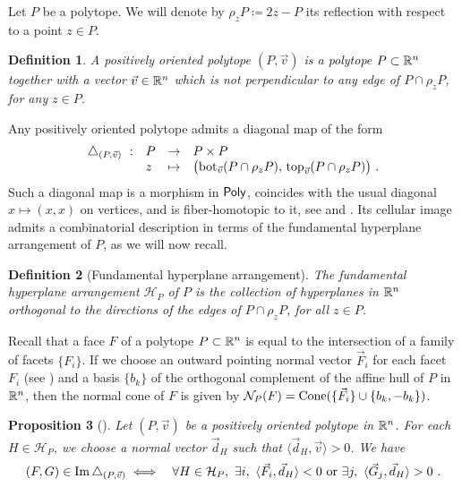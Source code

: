 \documentclass[twoside, 11pt]{amsart}
\newtheorem{definition}{Definition}[section]
\newtheorem{proposition}[definition]{Proposition}
\theoremstyle{remark}
\begin{document}
Let $P$ be a polytope.
We will denote by $\rho_z P \coloneqq 2z-P$ its reflection with respect to a point $z \in P$. 

\begin{definition}
A \emph{positively oriented polytope} $(P, \vec v)$ is a polytope $P \subset \mathbb{R}^n$ together with a vector $\vec v\in \mathbb{R}^n$ which is not perpendicular to any edge of $P\cap \rho_z P$, for any $z \in P$.
\end{definition}

Any positively oriented polytope admits a diagonal map of the form
\begin{align*}
\begin{array}{rlcl}
\triangle_{(P,\vec v)}\  : & P &\to  &P \times P\\
&z & \mapsto& 
\bigl(\operatorname{bot}_{\vec v}(P\cap \rho_zP),\,  \operatorname{top}_{\vec v}(P\cap \rho_z P)\bigr) \ .
\end{array}
\end{align*}
Such a diagonal map is a morphism in $\mathsf{Poly}$, coincides with the usual diagonal $x\mapsto (x, x)$ on vertices, and is fiber-homotopic to it, see \cite[Proposition~5]{MTTV19} and \cite[Proposition 1.1]{LA21}.
Its cellular image admits a combinatorial description in terms of the fundamental hyperplane arrangement of $P$, as we will now recall.

\begin{definition}[Fundamental hyperplane arrangement]
  \label{def:fundamentalhyperplane} 
  The \emph{fundamental hyperplane arrangement} $\mathcal{H}_P$ of $P$ is the collection of hyperplanes in $\mathbb{R}^n$ orthogonal to the directions of the edges of $P\cap\rho_z P$, for all $z \in P$. 
\end{definition}

Recall that a face $F$ of a polytope $P \subset \mathbb{R}^n$ is equal to the intersection of a family of facets $\{F_i\}$. 
If we choose an outward pointing normal vector $\vec F_i$ for each facet $F_i$ (see \cite[Definition 1.24]{LA21}) and a basis $\{b_k\}$ of the orthogonal complement of the affine hull of $P$ in $\mathbb{R}^n$, then the normal cone of $F$ is given by $\mathcal{N}_P(F)=\operatorname{Cone}(\{\vec F_i\} \cup \{b_k,-b_k\})$. 

\begin{proposition}[{\cite[Theorem 1.23]{LA21}}]
  \label{thm:universalformula} 
  Let $(P,\vec v)$ be a positively oriented polytope in $\mathbb{R}^n$. For each $H\in\mathcal{H}_P$, we choose a normal vector $\vec d_H$ such that $\langle \vec d_H, \vec v \rangle >0$. We have 
\begin{eqnarray*}
  (F,G) \in \operatorname{Im} \triangle_{(P,\vec v)} 
  &\iff&  \forall H \in \mathcal{H}_P , \ \exists i , \ \langle \vec F_i, \vec d_H \rangle < 0  \text{ or } \exists j , \ \langle \vec G_j, \vec d_H \rangle > 0 \ . 
\end{eqnarray*} 
\end{proposition}
\end{document}
